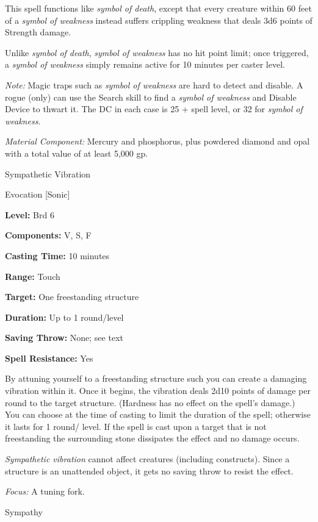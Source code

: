\documentclass{article}
\begin{document}
This spell functions like \textit{symbol of death}, except that every creature 
within 60 feet of a \textit{symbol of weakness }instead suffers crippling weakness 
that deals 3d6 points of Strength damage.

Unlike \textit{symbol of death}, \textit{symbol of weakness }has no hit point limit; 
once triggered, a \textit{symbol of weakness }simply remains active for 10 minutes 
per caster level.

\textit{Note: }Magic traps such as \textit{symbol of weakness }are hard to detect 
and disable. A rogue (only) can use the Search skill to find a \textit{symbol of 
weakness }and Disable Device to thwart it. The DC in each case is 25 + spell level, 
or 32 for \textit{symbol of weakness}.

\textit{Material Component: }Mercury and phosphorus, plus powdered diamond and 
opal with a total value of at least 5,000 gp.

\vspace{12pt}
Sympathetic Vibration

Evocation [Sonic]

\textbf{Level:} Brd 6

\textbf{Components:} V, S, F

\textbf{Casting Time:} 10 minutes

\textbf{Range:} Touch

\textbf{Target:} One freestanding structure

\textbf{Duration:} Up to 1 round/level

\textbf{Saving Throw:} None; see text

\textbf{Spell Resistance:} Yes

By attuning yourself to a freestanding structure such you can create a damaging 
vibration within it. Once it begins, the vibration deals 2d10 points of damage 
per round to the target structure. (Hardness has no effect on the spell's damage.) 
You can choose at the time of casting to limit the duration of the spell; otherwise 
it lasts for 1 round/ level. If the spell is cast upon a target that is not freestanding 
the surrounding stone dissipates the effect and no damage occurs.

\textit{Sympathetic vibration }cannot affect creatures (including constructs). 
Since a structure is an unattended object, it gets no saving throw to resist the 
effect.

\textit{Focus: }A tuning fork.

\vspace{12pt}
Sympathy
\end{document}
